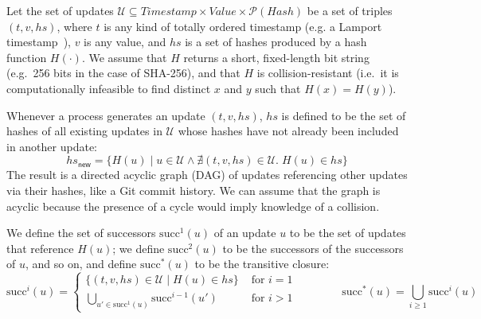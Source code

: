 \documentclass[manuscript]{acmart}
\begin{document}
Let the set of updates $\mathcal{U} \subseteq \mathit{Timestamp} \times \mathit{Value} \times \mathcal{P}(\mathit{Hash})$ be a set of triples $(t, v, \mathit{hs})$, where $t$ is any kind of totally ordered timestamp (e.g. a Lamport timestamp~\cite{Lamport:1978}), $v$ is any value, and $\mathit{hs}$ is a set of hashes produced by a hash function $H(\cdot)$.
We assume that $H$ returns a short, fixed-length bit string (e.g.\ 256 bits in the case of SHA-256), and that $H$ is collision-resistant (i.e.\ it is computationally infeasible to find distinct $x$ and $y$ such that $H(x) = H(y)$).

Whenever a process generates an update $(t, v, \mathit{hs})$, $\mathit{hs}$ is defined to be the set of hashes of all existing updates in $\mathcal{U}$ whose hashes have not already been included in another update:
\[
\mathit{hs}_\mathsf{new} = \{H(u) \mid u \in \mathcal{U} \wedge \nexists (t, v, \mathit{hs}) \in \mathcal{U}.\; H(u) \in \mathit{hs}\}
\]
The result is a directed acyclic graph (DAG) of updates referencing other updates via their hashes, like a Git commit history.
We can assume that the graph is acyclic because the presence of a cycle would imply knowledge of a collision.

We define the set of successors $\mathrm{succ}^1(u)$ of an update $u$ to be the set of updates that reference $H(u)$; we define $\mathrm{succ}^2(u)$ to be the successors of the successors of $u$, and so on, and define $\mathrm{succ}^*(u)$ to be the transitive closure:
\[
\mathrm{succ}^i(u) =
\begin{cases}
\{(t, v, \mathit{hs}) \in \mathcal{U} \mid H(u) \in \mathit{hs}\} & \text{ for } i=1 \\
\bigcup_{u' \in \mathrm{succ}^1(u)} \mathrm{succ}^{i-1}(u') & \text{ for } i>1
\end{cases}
\quad\quad\quad\quad
\mathrm{succ}^*(u) = \bigcup_{i \ge 1} \mathrm{succ}^i(u)
\]
\end{document}
